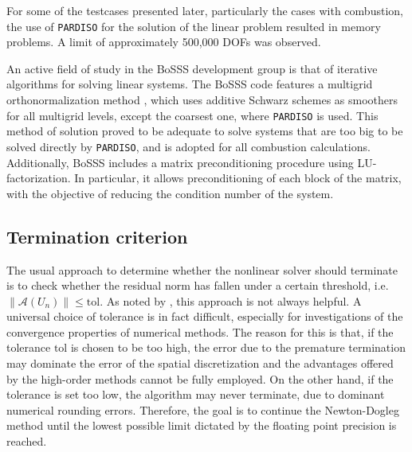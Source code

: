For some of the testcases presented later, particularly the cases with combustion, the use of \texttt{PARDISO} for the solution of the linear problem resulted in memory problems. A limit of approximately 500,000 DOFs was observed. 

An active field of study in the BoSSS development group is that of iterative algorithms for solving linear systems. The BoSSS code features a multigrid orthonormalization method \parencite{kummerBoSSSPackageMultigrid2021}, which uses additive Schwarz schemes as smoothers for all multigrid levels, except the coarsest one, where \texttt{PARDISO} is used. This method of solution proved to be adequate to solve systems that are too big to be solved directly by \texttt{PARDISO}, and is adopted for all combustion calculations.
Additionally, BoSSS includes a matrix preconditioning procedure using LU-factorization. In particular, it allows preconditioning of each block of the matrix, with the objective of reducing the condition number of the system.

\subsection{Termination criterion} \label{ssec:TerminationCriterion}
The usual approach to determine whether the nonlinear solver should terminate is to check whether the residual norm has fallen under a certain threshold, i.e.
$ \| \mathcal{A}(U_n) \| \leq \textrm{tol}  $. As noted by \textcite{pawlowskiInexactNewtonDogleg2008}, this approach is not always helpful. A universal choice of tolerance is in fact difficult, especially for investigations of the convergence properties of numerical methods. 
The reason for this is that, if the tolerance $\textrm{tol}$ is chosen to be too high, the error due to the premature termination may dominate the error of the spatial discretization and the advantages offered by the high-order methods cannot be fully employed. On the other hand, if the tolerance is set too low, the algorithm may never terminate, due to dominant numerical rounding errors.  Therefore, the goal is to continue the Newton-Dogleg method until the lowest possible limit dictated by the floating point precision is reached. 

